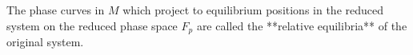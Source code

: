 The phase curves in $M$ which project to equilibrium positions in the reduced system on the reduced phase space $F_p$ are called the **relative equilibria** of the original system.
